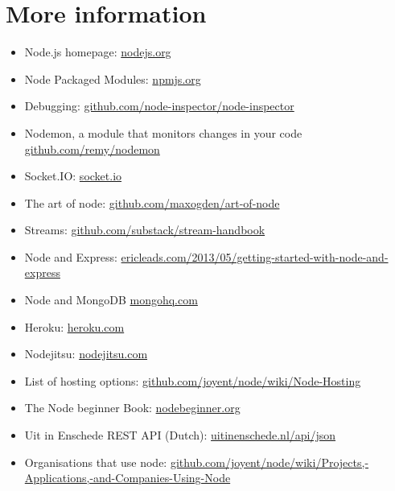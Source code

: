 \documentclass[a4paper]{report}
\begin{document}
\section*{More information} 
\begin{itemize} 
	\item Node.js homepage: \href{http://nodejs.org}{nodejs.org} 
	\item Node Packaged Modules: \href{https://npmjs.org/}{npmjs.org} 
	\item Debugging: \href{https://github.com/node-inspector/node-inspector}{github.com/node-inspector/node-inspector}
	\item Nodemon, a module that monitors changes in your code \href{https://github.com/remy/nodemon}{github.com/remy/nodemon} 
	\item Socket.IO: \href{http://socket.io/}{socket.io} 
	\item The art of node: \href{https://github.com/maxogden/art-of-node}{github.com/maxogden/art-of-node} 
	\item Streams: \href{https://github.com/substack/stream-handbook}{github.com/substack/stream-handbook} 
	\item Node and Express: \href{http://ericleads.com/2013/05/getting-started-with-node-and-express/}{ericleads.com/2013/05/getting-started-with-node-and-express} 
	\item Node and MongoDB \href{http://blog.mongohq.com/node-js-mongodb-and-you-an-intro-in-parts/}{mongohq.com} 
	\item Heroku: \href{https://www.heroku.com/}{heroku.com} 
	\item Nodejitsu: \href{https://www.nodejitsu.com/}{nodejitsu.com} 
	\item List of hosting options: \href{https://github.com/joyent/node/wiki/Node-Hosting}{github.com/joyent/node/wiki/Node-Hosting} 
	\item The Node beginner Book: \href{http://www.nodebeginner.org/}{nodebeginner.org} 
	\item Uit in Enschede REST API (Dutch): \href{http://www.uitinenschede.nl/api/json/?page=index}{uitinenschede.nl/api/json} 
	\item Organisations that use node: \href{https://github.com/joyent/node/wiki/Projects,-Applications,-and-Companies-Using-Node}{github.com/joyent/node/wiki/Projects,-Applications,-and-Companies-Using-Node} 
\end{itemize} 
 
 
\end{document}
